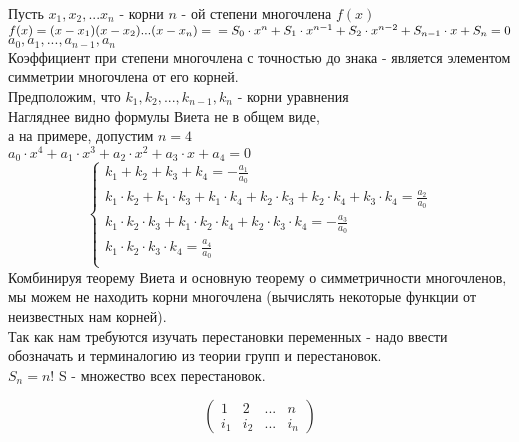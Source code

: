 \begin{theorem}[ Виета]
	Пусть $x_1, x_2, ... x_n$ - корни $n$ - ой степени многочлена $f(x)$\\
	$f(x) = (x - x_1)(x - x_2) ... (x - x_n) = \\
           = S_0 \cdot x^n + S_1 \cdot  x^{n - 1} + S_2 \cdot x^{n - 2}+ S_{n-1}\cdot x+ S_n = 0$\\
           $a_0, a_1, ... , a_{n-1}, a_n$\\
	Коэффициент при степени многочлена с точностью до знака - является элементом
	симметрии многочлена от его корней.\\
          Предположим, что $k_1, k_2, ... , k_{n-1}, k_n$ - корни уравнения\\
          Нагляднее видно формулы Виета не в общем виде,\\
           а на примере, допустим $n = 4$\\
          $a_0\cdot x^4 + a_1 \cdot x^3 + a_2\cdot x^2 + a_3\cdot x + a_4 = 0$\\
          \begin{equation*}
          \begin{cases}
            k_1 + k_2 + k_3 + k_4 = - \frac{a_1}{a_0}\\
            k_1\cdot k_2 + k_1\cdot k_3 + k_1\cdot k_4 + k_2\cdot k_3 + k_2\cdot k_4 + k_3\cdot k_4 = \frac{a_2}{a_0}\\
            k_1 \cdot k_2\cdot k_3 + k_1\cdot k_2\cdot k_4 + k_2\cdot k_3\cdot k_4 = - \frac{a_3}{a_0}\\
            k_1\cdot k_2\cdot k_3\cdot k_4 = \frac{a_4}{a_0}\\
          \end{cases}
          \end{equation*}
	Комбинируя теорему Виета и основную теорему о симметричности многочленов, мы
	можем не находить корни многочлена (вычислять некоторые функции от неизвестных
	нам корней).\\
	Так как нам требуются изучать перестановки переменных - надо ввести обозначать
	и терминалогию из теории групп и перестановок.\\
	$S_n = n!$ S - множество всех перестановок.
\end{theorem}

\begin{displaymath}
\left( \begin{array}{lccr}
1 & 2 & ... & n \\
i_1 & i_2 & ... & i_n
\end{array}\right)
\end{displaymath}

